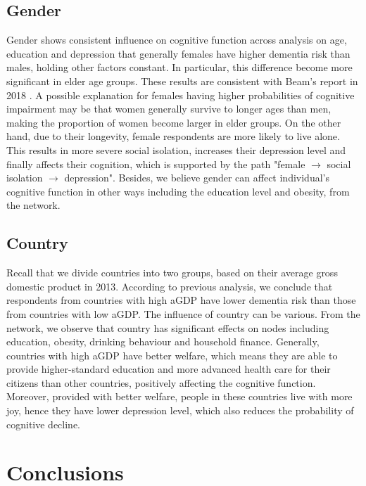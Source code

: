 \documentclass[11pt,twoside]{article}
\numberwithin{Theorem}{section}
\numberwithin{Definition}{section}
\numberwithin{Lemma}{section}
\numberwithin{Algorithm}{section}
\numberwithin{equation}{section}
\begin{document}
\subsection{Gender}

Gender shows consistent influence on cognitive function across analysis on age, education and depression that generally females have higher dementia risk than males, holding other factors constant. In particular, this difference become more significant in elder age groups. These results are consistent with Beam's report in 2018 \cite{beam2018differences}.  A possible explanation for females having higher probabilities of cognitive impairment may be that women generally survive to longer ages than men, making the proportion of women become larger in elder groups. On the other hand, due to their longevity, female respondents are more likely to live alone. This results in more severe social isolation, increases their depression level and finally affects their cognition, which is supported by the path "female $\rightarrow$ social isolation $\rightarrow$ depression". Besides, we believe gender can affect individual's cognitive function in other ways including the education level and obesity, from the network.

\subsection{Country}

Recall that we divide countries into two groups, based on their average gross domestic product in 2013. According to previous analysis, we conclude that respondents from countries with high aGDP have lower dementia risk than those from countries with low aGDP. The influence of country can be various. From the network, we observe that country has significant effects on nodes including education, obesity, drinking behaviour and household finance. Generally, countries with high aGDP have better welfare, which means they are able to provide higher-standard education and more advanced health care for their citizens than other countries, positively affecting the cognitive function. Moreover, provided with better welfare, people in these countries live with more joy, hence they have lower depression level, which also reduces the probability of cognitive decline.

\clearpage

\section{Conclusions}
\end{document}

